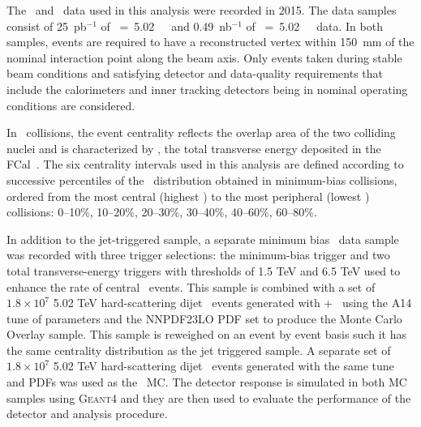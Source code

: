 
The \PbPb\ and \pp\ data used in this analysis were recorded in 2015.
 The data samples consist of 25~pb$^{-1}$ of \sqrts~=~5.02~\TeV\ \pp\ and 0.49~nb$^{-1}$ of \sqrtsnn~=~5.02~\TeV\
\pbpb\ data. In both samples, events are required to have a reconstructed vertex
within 150~mm of the nominal interaction point along the beam axis.
Only events taken during stable beam conditions and satisfying detector and data-quality requirements that include the calorimeters and inner tracking detectors being in nominal operating conditions are considered. 



In \PbPb\ collisions, the event centrality reflects the overlap area of the two colliding nuclei and is characterized by \ETfcal, the total transverse energy deposited in the 
FCal~\cite{Aaboud:2017tql}. The six centrality intervals used in this analysis are defined according to successive percentiles of the \ETfcal\ distribution obtained in minimum-bias collisions, ordered from the most central (highest \ETfcal) to the most peripheral (lowest \ETfcal) collisions: 0--10\%, 10--20\%, 20--30\%, 30--40\%, 40--60\%, 60--80\%. 

In addition to the jet-triggered sample, a separate minimum bias \PbPb\ data sample was recorded with three trigger selections: the minimum-bias trigger and two total transverse-energy triggers with thresholds of 1.5 TeV and 6.5 TeV used to enhance the rate of central \pbpb\ events. This sample is combined with a set of $1.8\times10^7$ 5.02 TeV hard-scattering dijet \pp\ events generated with \powheg{}+\pythiaeight\ \cite{Nason:2004rx,Sjostrand:2014zea} using the A14 tune of parameters \cite{ATLAS2014021} and the NNPDF23LO PDF set \cite{Ball:2012cx} to produce the Monte Carlo Overlay sample. This sample is reweighed on an event by event basis such it has the same centrality distribution as the jet triggered sample.
A separate set of $1.8\times10^7$ 5.02 TeV hard-scattering dijet \pp\ events generated with the same tune and PDFs was used as the \pp\ MC. The detector response is simulated in both MC samples using \textsc{Geant4} \cite{Agostinelli:2002hh,Aad:2010ah} and they are then used to evaluate the performance of the detector and analysis procedure. 


